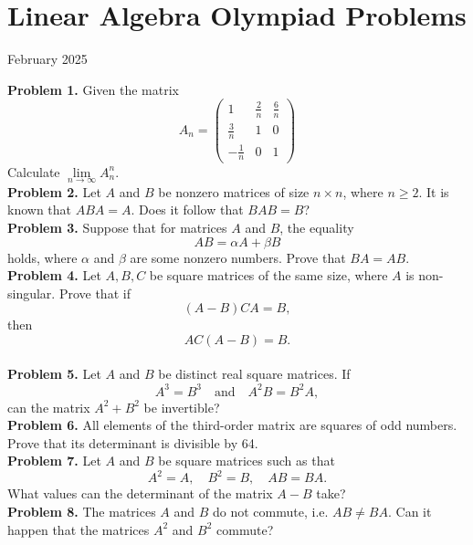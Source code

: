 \documentclass{article}
\begin{document}
\pagestyle{plain}

\section*{Linear Algebra Olympiad Problems}

\begin{center}
February 2025
\end{center}

\textbf{Problem 1.}
Given the matrix
\[
A_n = \begin{pmatrix}
1 & \frac{2}{n} & \frac{6}{n} \\
\frac{3}{n} & 1 & 0 \\
-\frac{1}{n} & 0 & 1
\end{pmatrix}
\]
Calculate \( \lim\limits_{n \to \infty} A_n^n \).
\\

\textbf{Problem 2.}
Let \( A \) and \( B \) be nonzero matrices of size \( n \times n \), where \( n \geq 2 \).
It is known that \( ABA = A \). Does it follow that \( BAB = B \)?
\\

\textbf{Problem 3.}
Suppose that for matrices \( A \) and \( B \), the equality
\[
AB = \alpha A + \beta B
\]
holds, where \( \alpha \) and \( \beta \) are some nonzero numbers. Prove that \( BA = AB \).
\\

\textbf{Problem 4.}
Let \( A, B, C \) be square matrices of the same size, where \( A \) is non-singular. Prove that if
\[
(A - B)CA = B,
\]
then
\[
AC(A - B) = B.
\]
\\

\textbf{Problem 5.}
Let \( A \) and \( B \) be distinct real square matrices. If
\[
A^3 = B^3 \quad \text{and} \quad A^2 B = B^2 A,
\]
can the matrix \( A^2 + B^2 \) be invertible?
\\

\textbf{Problem 6.}
All elements of the third-order matrix are squares of odd numbers.
Prove that its determinant is divisible by 64.
\\

\textbf{Problem 7.}
Let \( A \) and \( B \) be square matrices such as that
\[
A^2 = A, \quad B^2 = B, \quad AB = BA.
\]
What values can the determinant of the matrix \( A - B \) take?
\\

\textbf{Problem 8.}
The matrices \( A \) and \( B \) do not commute, i.e. \( AB \neq BA \). Can it happen that the matrices \( A^2 \) and \( B^2 \) commute?
\\
\end{document}
